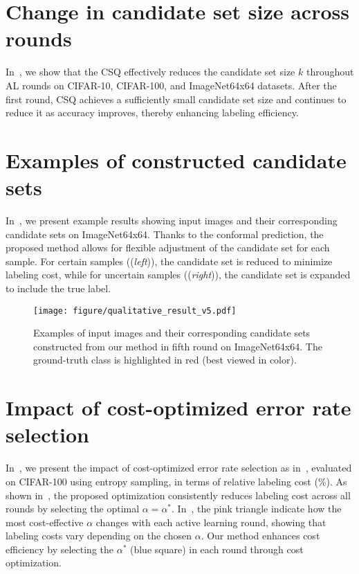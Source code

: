 

\section{Change in candidate set size across rounds}
In~, we show that the CSQ effectively reduces the candidate set size $k$ throughout AL rounds on CIFAR-10, CIFAR-100, and ImageNet64x64 datasets.
After the first round, CSQ achieves a sufficiently small candidate set size and continues to reduce it as accuracy improves, thereby enhancing labeling efficiency.



\section{Examples of constructed candidate sets}
In~, we present example results showing input images and their corresponding candidate sets on ImageNet64x64.
Thanks to the conformal prediction, the proposed method allows for flexible adjustment of the candidate set for each sample.
For certain samples ((\textit{left})), the candidate set is reduced to minimize labeling cost, while for uncertain samples ((\textit{right})), the candidate set is expanded to include the true label.
\begin{figure*}
    \centering
    \texttt{[image: figure/qualitative\_result\_v5.pdf]}
    \caption{Examples of input images and their corresponding candidate sets constructed from our method in fifth round on ImageNet64x64.
    The ground-truth class is highlighted in red (best viewed in color).}
    \label{fig:qual}
\end{figure*}

\section{Impact of cost-optimized error rate selection}
\label{app:ablation_cost_opt}
In~, we present the impact of cost-optimized error rate selection as in~, evaluated on CIFAR-100 using entropy sampling, in terms of relative labeling cost (\%).
As shown in~, the proposed optimization consistently reduces labeling cost across all rounds by selecting the optimal $\alpha = \alpha^*$.
In~, the pink triangle indicate how the most cost-effective $\alpha$ changes with each active learning round, showing that labeling costs vary depending on the chosen $\alpha$.
Our method enhances cost efficiency by selecting the $\alpha^*$ (blue square) in each round through cost optimization.
    
